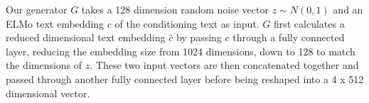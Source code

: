 Our generator $G$ takes a 128 dimension random noise vector $z \sim N(0, 1)$ and an ELMo text embedding $c$ of the conditioning text as input. $G$ first calculates a reduced dimensional text embedding $\hat{c}$ by passing $c$ through a fully connected layer, reducing the embedding size from 1024 dimensions, down to 128 to match the dimensions of $z$. These two input vectors are then concatenated together and passed through another fully connected layer before being reshaped into a 4 x 512 dimensional vector.